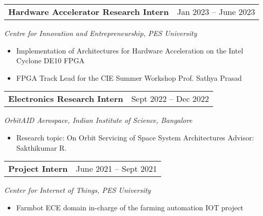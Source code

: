 \begin{tabular}{@{}p{4in}p{2in}}
  {\bf{Hardware Accelerator Research Intern}}  & Jan 2023 – June 2023 \\
\end{tabular}
\textit{Centre for Innovation and Entrepreneurship, PES University} 
\begin{itemize}
    \setlength\itemsep{0em}
      \item Implementation of Architectures for Hardware Acceleration on the Intel
  Cyclone DE10 FPGA
      \item FPGA Track Lead for the CIE Summer Workshop
      \subitem Prof. Sathya Prasad 
\end{itemize}

\begin{tabular}{@{}p{4in}p{2in}}
  {\bf{Electronics Research Intern}} & Sept 2022 – Dec 2022 \\
\end{tabular}
\textit{OrbitAID Aerospace, Indian Institute of Science, Bangalore}  
\begin{itemize}
  \setlength\itemsep{0em}
  \item Research topic: On Orbit Servicing of Space System Architectures
  \subitem Advisor: Sakthikumar R.
\end{itemize}

\begin{tabular}{@{}p{4in}p{2in}}
  {\bf{Project Intern}} & June 2021 – Sept 2021 \\
\end{tabular}
\textit{Center for Internet of Things, PES University}  
\begin{itemize}
  \item Farmbot
  \subitem ECE domain in-charge of the farming automation IOT project
\end{itemize}
\endinput

